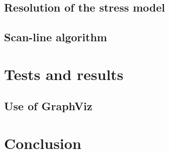 \documentclass[12pt]{report}
\begin{document}
\section{Resolution of the stress model}
\section{Scan-line algorithm}

\chapter{Tests and results}

\section{Use of GraphViz}

\chapter{Conclusion}



\end{document}
